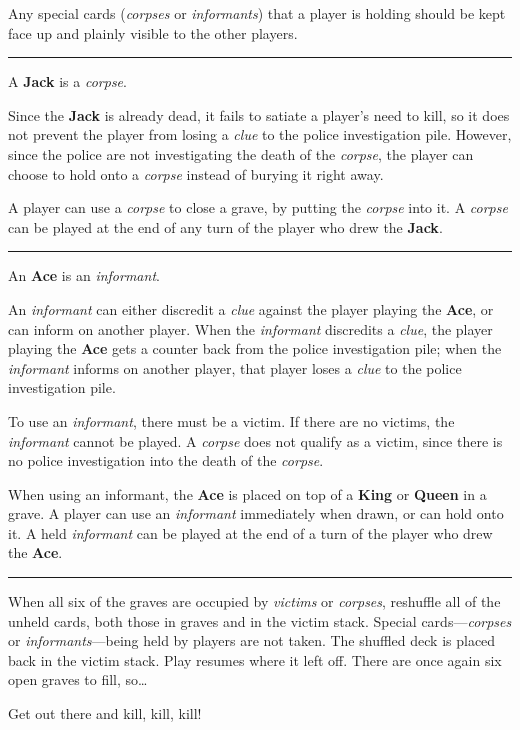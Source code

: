 \documentclass[]{article}
\begin{document}
Any special cards (\emph{corpses} or \emph{informants}) that a player is
holding should be kept face up and plainly visible to the other players.\smallskip\hrule\smallskip

A \textbf{Jack} is a \emph{corpse}.

Since the \textbf{Jack} is already dead, it fails to satiate a player's
need to kill, so it does not prevent the player from losing a
\emph{clue} to the police investigation pile. However, since the police
are not investigating the death of the \emph{corpse}, the player can
choose to hold onto a \emph{corpse} instead of burying it right away.

A player can use a \emph{corpse} to close a grave, by putting the
\emph{corpse} into it. A \emph{corpse} can be played at the end of any
turn of the player who drew the \textbf{Jack}.\smallskip\hrule\smallskip

An \textbf{Ace} is an \emph{informant}.

An \emph{informant} can either discredit a \emph{clue} against the
player playing the \textbf{Ace}, or can inform on another player. When
the \emph{informant} discredits a \emph{clue}, the player playing the
\textbf{Ace} gets a counter back from the police investigation pile;
when the \emph{informant} informs on another player, that player loses a
\emph{clue} to the police investigation pile.

To use an \emph{informant}, there must be a victim. If there are no
victims, the \emph{informant} cannot be played. A \emph{corpse} does not
qualify as a victim, since there is no police investigation into the
death of the \emph{corpse}.

When using an informant, the \textbf{Ace} is placed on top of a
\textbf{King} or \textbf{Queen} in a grave. A player can use an
\emph{informant} immediately when drawn, or can hold onto it. A held
\emph{informant} can be played at the end of a turn of the player who
drew the \textbf{Ace}.\smallskip\hrule\smallskip

When all six of the graves are occupied by \emph{victims} or
\emph{corpses}, reshuffle all of the unheld cards, both those in graves
and in the victim stack. Special cards---\emph{corpses} or
\emph{informants}---being held by players are not taken. The shuffled
deck is placed back in the victim stack. Play resumes where it left off.
There are once again six open graves to fill, so\ldots{}

Get out there and kill, kill, kill!
\end{document}
